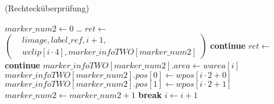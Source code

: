 \begin{algorithm}[ht]
\caption{ (Rechtecküberprüfung)}
\label{alg:detectmarker2-3}
\begin{algorithmic}[1]
	\State $\mathit{marker\_num2} \gets 0$
	\label{alg:detectmarker2-3-loop-start}
		\State \ldots
		\State $\mathit{ret} \gets$ $\left(
		\begin{aligned}
			& \mathit{limage}, \mathit{label\_ref}, i + 1,\\
			& \mathit{wclip}[i \cdot 4], \mathit{marker\_infoTWO}[\mathit{marker\_num2}]
		\end{aligned}\right)$
		\label{alg:detectmarker2-3-retvalue}
			\State \textbf{continue}
			\label{alg:detectmarker2-3-continue}
		\EndIf
		\State $\mathit{ret} \gets$ 
		\label{alg:detectmarker2-3-checksquare}
			\State \textbf{continue}
			\label{alg:detectmarker2-3-continue2}
		\EndIf
		\State $\mathit{marker\_infoTWO}[marker\_num2].area \gets \mathit{warea}[i]$
		\label{alg:detectmarker2-3-save-start}
		\State $\mathit{marker\_infoTWO}[marker\_num2].pos[0] \gets \mathit{wpos}[i \cdot 2 + 0]$
		\State $\mathit{marker\_infoTWO}[marker\_num2].pos[1] \gets \mathit{wpos}[i \cdot 2 + 1]$
		\State $\mathit{marker\_num2} \gets \mathit{marker\_num2} + 1$
		\label{alg:detectmarker2-3-save-end}
		\label{alg:detectmarker2-3-maxpatterns}
			\State \textbf{break}
		\EndIf
		\State $i \gets i + 1$
	\EndFor
	\label{alg:detectmarker2-3-loop-end}
\end{algorithmic}
\end{algorithm}
